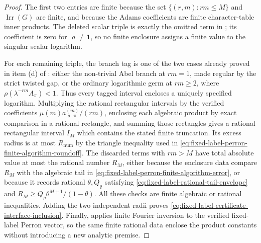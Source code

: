 \documentclass[11pt,a4paper]{amsart}
\theoremstyle{plain}
\theoremstyle{definition}
\theoremstyle{remark}
\DeclareMathOperator{\Irr}{Irr}
\begin{document}
\begin{proof}
  The first two entries are finite because the set
  \(\{(r,m):rm\le M\}\) and \(\Irr(G)\) are finite, and because the Adams
  coefficients are finite character-table inner products.  The deleted scalar
  triple is exactly the omitted term in
  ; its coefficient is zero for
  \(\varrho\ne\mathbf1\), so no finite enclosure assigns a finite value
  to the singular scalar logarithm.

  For each remaining triple, the branch tag is one of the two cases already
  proved in item \textup{(d)} of
  : either the non-trivial
  Abel branch at \(rm=1\), made regular by the strict twisted gap, or the
  ordinary logarithmic germ at \(rm\ge2\), where
  \(\rho(\lambda^{-rm}A_\pi)<1\).  Thus every tagged interval encloses a
  uniquely specified logarithm.  Multiplying the rational rectangular
  intervals by the verified coefficients \(\mu(m)a_{\varrho,\pi}^{(m)}/(rm)\),
  enclosing each algebraic product by exact comparison in a rational rectangle,
  and summing those rectangles gives a rational rectangular interval \(I_M\)
  which contains the stated finite truncation.  Its excess radius is at most
  \(R_{\mathrm{num}}\) by the triangle inequality used in
  \eqref{eq:fixed-label-perron-finite-algorithm-roundoff}.  The discarded
  terms with \(rm>M\) have total absolute value at most the rational number
  \(R_M\), either because the enclosure data compare \(R_M\) with the algebraic
  tail in \eqref{eq:fixed-label-perron-finite-algorithm-error}, or because it
  records rational \(\theta,Q_\varrho\) satisfying
  \eqref{eq:fixed-label-rational-tail-envelope} and
  \(R_M\ge Q_\varrho\theta^{M+1}/(1-\theta)\).  All these checks are finite
  algebraic or rational inequalities.  Adding the two independent radii proves
  \eqref{eq:fixed-label-certificate-interface-inclusion}.  Finally,
   applies finite Fourier inversion
  to the verified fixed-label Perron vector, so the same finite rational data
  enclose the product constants without introducing a new analytic premise.
\end{proof}
\end{document}
